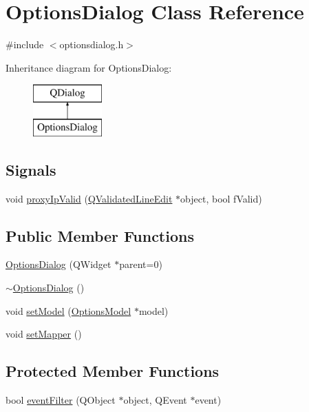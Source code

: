 \hypertarget{class_options_dialog}{}\section{Options\+Dialog Class Reference}
\label{class_options_dialog}


{\ttfamily \#include $<$optionsdialog.\+h$>$}

Inheritance diagram for Options\+Dialog\+:\begin{figure}[H]
\begin{center}
\leavevmode
\includegraphics[height=2.000000cm]{class_options_dialog}
\end{center}
\end{figure}
\subsection*{Signals}
\begin{DoxyCompactItemize}
\item 
void \hyperlink{class_options_dialog_a3fbb90cc43d10d4b0d0dc3f1994d6b11}{proxy\+Ip\+Valid} (\hyperlink{class_q_validated_line_edit}{Q\+Validated\+Line\+Edit} $\ast$object, bool f\+Valid)
\end{DoxyCompactItemize}
\subsection*{Public Member Functions}
\begin{DoxyCompactItemize}
\item 
\hyperlink{class_options_dialog_af337a8527d06061c7dd91e626854d735}{Options\+Dialog} (Q\+Widget $\ast$parent=0)
\item 
\hyperlink{class_options_dialog_afe1e5729e15ddf1c9e6f5b9cb6157c57}{$\sim$\+Options\+Dialog} ()
\item 
void \hyperlink{class_options_dialog_a11e902a52cb7472497d14e70cd9399d9}{set\+Model} (\hyperlink{class_options_model}{Options\+Model} $\ast$model)
\item 
void \hyperlink{class_options_dialog_a2088ec5bbb90ec27675f441e750e55b8}{set\+Mapper} ()
\end{DoxyCompactItemize}
\subsection*{Protected Member Functions}
\begin{DoxyCompactItemize}
\item 
bool \hyperlink{class_options_dialog_abf2b8046ca9bce3f2c1f04e329468983}{event\+Filter} (Q\+Object $\ast$object, Q\+Event $\ast$event)
\end{DoxyCompactItemize}



